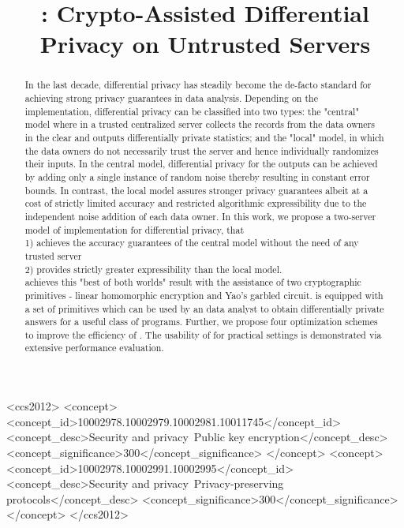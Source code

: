 \documentclass[sigconf]{acmart}
\begin{document}
\title{\system: Crypto-Assisted Differential Privacy on Untrusted Servers}
\author{}
\begin{abstract}
In the last decade, differential privacy has steadily become the de-facto standard for achieving strong privacy guarantees in data analysis. Depending on the implementation, differential privacy can be classified into two types: the "central" model where in a trusted centralized server collects the records from the data owners in the clear and outputs differentially private statistics; and the "local" model, in which the data owners do not necessarily trust the server and hence individually randomizes their inputs.  In the central model, differential privacy for the outputs can be achieved by adding only a single instance of random noise thereby resulting in constant error bounds. In contrast, the local model assures stronger privacy guarantees  albeit at a cost of strictly limited accuracy and restricted algorithmic expressibility due to the independent noise addition of each data owner. In this work, we propose a  two-server model of implementation for differential privacy, \system  that  \\
1) achieves the accuracy guarantees of the central model without the need of any trusted server \\
2) provides strictly greater expressibility than the local model. \\
\system achieves this "best of both worlds" result with the assistance of two cryptographic primitives - linear homomorphic encryption and  Yao's garbled circuit. \system is equipped with a set of primitives which can be used by an data analyst to obtain differentially private answers for a useful class of programs. Further, we propose four optimization schemes to improve the efficiency of \system.  The  usability of \system for practical settings is demonstrated via extensive performance evaluation.
\end{abstract}
\begin{CCSXML}
<ccs2012>
<concept>
<concept_id>10002978.10002979.10002981.10011745</concept_id>
<concept_desc>Security and privacy~Public key encryption</concept_desc>
<concept_significance>300</concept_significance>
</concept>
<concept>
<concept_id>10002978.10002991.10002995</concept_id>
<concept_desc>Security and privacy~Privacy-preserving protocols</concept_desc>
<concept_significance>300</concept_significance>
</concept>
</ccs2012>
\end{CCSXML}
\end{document}
